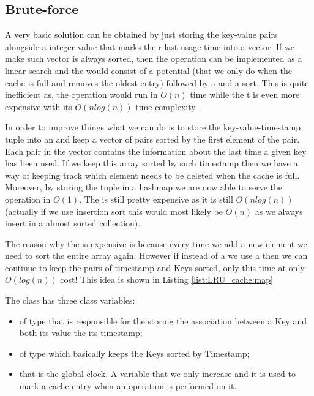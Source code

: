 
\subsection{Brute-force}
\label{LRU_cache:sec:bruteforce}
A very basic solution can be obtained by just storing the key-value pairs alongside a integer value that marks their last usage time into a vector. If we make such vector is always sorted, then 
the  operation can be implemented as a linear search and the  would consist of a potential  (that we only do when the cache is full and removes the oldest entry) followed by a  
and a sort. 
This is quite inefficient as, the  operation would run in $O(n)$ time while the t is even more expensive with its $O(n log(n))$ time complexity.

In order to improve things what we can do is to store the key-value-timestamp tuple into an  and keep a vector of pairs  sorted by the first element of the pair.
Each pair in the vector contains the information about the last time a given key has been used.
If we keep this array sorted by such timestamp then we have a way of keeping track which element needs to be deleted when the cache is full.
Moreover, by storing the tuple in a hashmap we are now able to serve the  operation in $O(1)$. The  is still pretty expensive as it is still $O(n log(n))$ (actually if we use insertion sort this would most likely be $O(n)$ as we always insert in a almost sorted collection).

The reason why the  is expensive is because every time we add a new element we need to sort the entire array again.
However if instead of a  we use a  then we can continue to keep the pairs of timestamp and Keys sorted, only this time at only $O(log(n))$ cost!
This  idea is shown in Listing \ref{list:LRU_cache:map}



The class  has three class variables:
\begin{itemize}
	\item {} of type  that is responsible for the storing the association between a Key and both its value the its timestamp;
	\item {} of type  which basically keeps the Keys sorted by Timestamp;
	\item {} that is the global clock. A variable that we only increase and it is used to mark a cache entry when an operation is performed on it.
\end{itemize}

